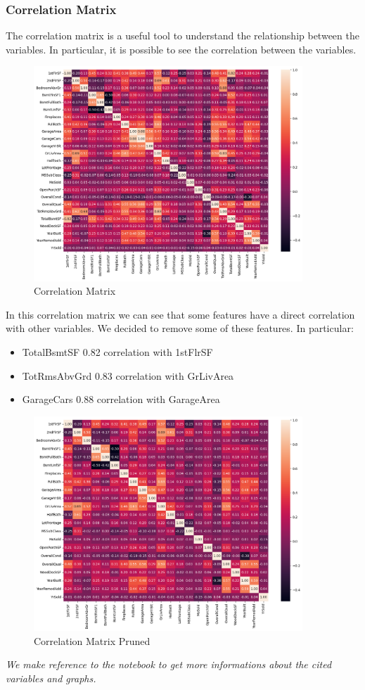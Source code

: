 \subsubsection*{Correlation Matrix}
The correlation matrix is a useful tool to understand the relationship between the variables. In particular, it is possible to see the correlation between the variables.

\begin{figure}[h!]
    \centering
    \includegraphics[width=0.9\textwidth]{imgs/CorrMatrixUnpruned.png}
    \caption{Correlation Matrix}
    \label{fig:corr}
\end{figure}

In this correlation matrix we can see that some features have a direct correlation with other variables. We decided to remove some of these features. In particular:
\begin{itemize}
    \item TotalBsmtSF 0.82 correlation with 1stFlrSF
    \item TotRmsAbvGrd 0.83 correlation with GrLivArea
    \item GarageCars 0.88 correlation with GarageArea
\end{itemize}

\begin{figure}[h!]
    \centering
    \includegraphics[width=0.9\textwidth]{imgs/CorrMatrix.png}
    \caption{Correlation Matrix Pruned}
    \label{fig:corrpruned}
\end{figure}
\newpage
\emph{We make reference to the notebook to get more informations about the cited variables and graphs.}